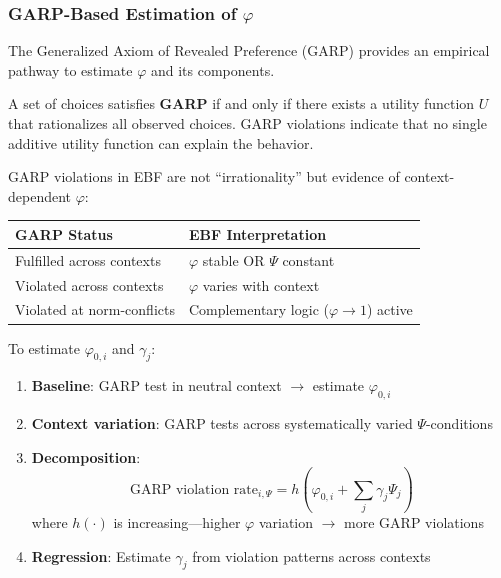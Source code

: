 \subsubsection{GARP-Based Estimation of $\varphi$}

The Generalized Axiom of Revealed Preference (GARP) provides an empirical pathway to estimate $\varphi$ and its components.

\begin{definition}[GARP]
\label{def:garp}
A set of choices satisfies \textbf{GARP} if and only if there exists a utility function $U$ that rationalizes all observed choices. GARP violations indicate that no single additive utility function can explain the behavior.
\end{definition}

\begin{definition}
\label{def:garp-phi}
GARP violations in EBF are not ``irrationality'' but evidence of context-dependent $\varphi$:
\begin{table}[htbp]
\centering
\begin{tabular}{@{}ll@{}}
\toprule
\textbf{GARP Status} & \textbf{EBF Interpretation} \\
\midrule
Fulfilled across contexts & $\varphi$ stable OR $\Psi$ constant \\
Violated across contexts & $\varphi$ varies with context \\
Violated at norm-conflicts & Complementary logic ($\varphi \rightarrow 1$) active \\
\bottomrule
\end{tabular}
\end{table}
\end{definition}

\begin{definition}
\label{def:garp-protocol}
To estimate $\varphi_{0,i}$ and $\gamma_j$:
\begin{enumerate}
\item \textbf{Baseline}: GARP test in neutral context $\rightarrow$ estimate $\varphi_{0,i}$
\item \textbf{Context variation}: GARP tests across systematically varied $\Psi$-conditions
\item \textbf{Decomposition}: 
\begin{equation}
\text{GARP violation rate}_{i,\Psi} = h(\varphi_{0,i} + \sum_j \gamma_j \Psi_j)
\end{equation}
where $h(\cdot)$ is increasing---higher $\varphi$ variation $\rightarrow$ more GARP violations
\item \textbf{Regression}: Estimate $\gamma_j$ from violation patterns across contexts
\end{enumerate}
\end{definition}

